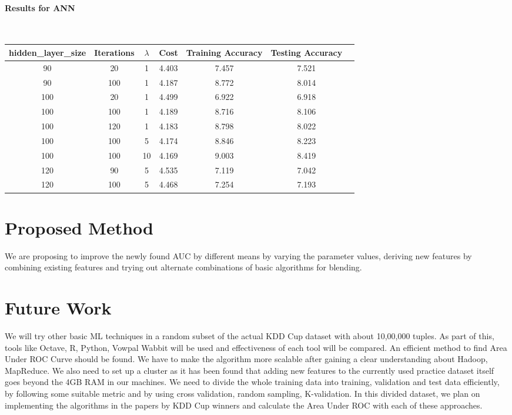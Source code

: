 \documentclass[10pt]{article}
\begin{document}
\paragraph{Results for ANN}\\
\begin{center}
 \begin{tabular}{|c | c | c | c | c | c | c||} 
 \hline
hidden\_layer\_size & Iterations & $\lambda$ & Cost & Training Accuracy & Testing Accuracy\\ [0.5ex] 
 \hline\hline
90 & 20 & 1 & 4.403 & 7.457 & 7.521\\ 
 \hline
90 & 100 & 1 & 4.187 & 8.772 & 8.014\\  
 \hline
100 & 20 & 1 & 4.499 & 6.922 & 6.918\\ 
 \hline
100 & 100 & 1 & 4.189 & 8.716 & 8.106\\
 \hline
100 & 120 & 1 & 4.183 & 8.798 & 8.022\\ 
 \hline
100 & 100 & 5 & 4.174 & 8.846 & 8.223\\  
 \hline
100 & 100 & 10 & 4.169 & 9.003 & 8.419\\  
 \hline
120 & 90 & 5 & 4.535 & 7.119 & 7.042\\  
 \hline
120 & 100 & 5 & 4.468 & 7.254 & 7.193\\  
 \hline
\end{tabular}
\end{center}
\section{Proposed Method}
We are proposing to improve the newly found AUC by different means by varying the parameter values, deriving new features by combining existing features and trying out alternate combinations of basic algorithms for blending.
\section{Future Work}
We will try other basic ML techniques in a random subset of the actual KDD Cup dataset with about 10,00,000 tuples. As part of this, tools like Octave, R, Python, Vowpal Wabbit will be used and effectiveness of each tool will be compared. An efficient method to find Area Under ROC Curve should be found. We have to make the algorithm more scalable after gaining a clear understanding about Hadoop, MapReduce. We also need to set up a cluster as it has been found that adding new features to the currently used practice dataset itself goes beyond the 4GB RAM in our machines. We need to divide the whole training data into training, validation and test data efficiently, by following some suitable metric and by using cross validation, random sampling, K­-validation. In this divided dataset, we plan on implementing the algorithms in the papers by KDD Cup winners and calculate the Area Under ROC with each of these approaches.
\end{document}

